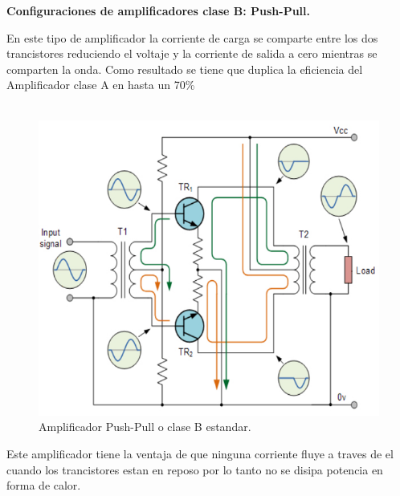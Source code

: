 \documentclass[letterpaper]{article}
\begin{document}
\begin{large}
\begin{center}
            \textbf{Configuraciones de amplificadores clase B: Push-Pull.}
        \end{center}
            En este tipo de amplificador la corriente de carga se comparte entre los dos trancistores reduciendo el voltaje y la corriente de salida a cero mientras se comparten la onda. Como resultado se tiene que duplica la eficiencia del Amplificador clase A en hasta un 70\%\\\\
        \begin{figure}[htbp]
            \centering
            \includegraphics[scale=0.5]{IMG/AmpTPP.jpg}
            \caption{Amplificador Push-Pull o clase B estandar.}
            \label{fig:cir1}
        \end{figure}
            Este amplificador tiene la ventaja de que ninguna corriente fluye a traves de el cuando los trancistores estan en reposo por lo tanto no se disipa potencia en forma de calor.\\\\
            \begin{figure}[htbp]
                \centering

\end{figure}
\end{large}
\end{document}

